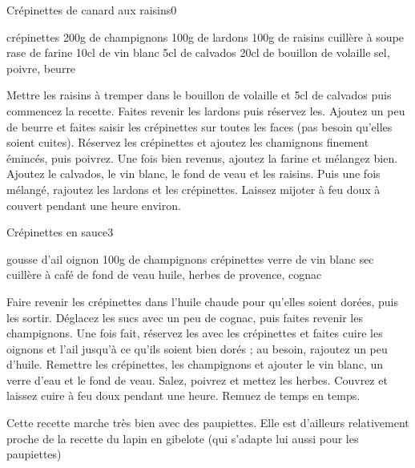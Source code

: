 \begin{recette}{Crépinettes de canard aux raisins}{0}{}{}
\begin{ingredients}
 crépinettes
\ingredient 200g de champignons
\ingredient 100g de lardons
\ingredient 100g de raisins
 cuillère à soupe rase de farine
\ingredient 10cl de vin blanc
\ingredient 5cl de calvados
\ingredient 20cl de bouillon de volaille
\ingredient sel, poivre, beurre
\end{ingredients}

\begin{preparation}
\etape Mettre les raisins à tremper dans le bouillon de volaille et 5cl de calvados puis commencez la recette.
\etape Faites revenir les lardons puis réservez les.
\etape Ajoutez un peu de beurre et faites saisir les crépinettes sur toutes les faces (pas besoin qu'elles soient cuites).
\etape Réservez les crépinettes et ajoutez les chamignons finement émincés, puis poivrez.
\etape Une fois bien revenus, ajoutez la farine et mélangez bien. Ajoutez le calvados, le vin blanc, le fond de veau et les raisins. Puis une fois mélangé, rajoutez les lardons et les crépinettes.
\etape Laissez mijoter à feu doux à couvert pendant une heure environ.
\end{preparation}
\end{recette}

\begin{recette}{Crépinettes en sauce}{3}{}{}

\begin{ingredients}
 gousse d'ail
 oignon
\ingredient 100g de champignons
 crépinettes
 verre de vin blanc sec
 cuillère à café de fond de veau
\ingredient huile, herbes de provence, cognac
\end{ingredients}

\begin{preparation}
\etape Faire revenir les crépinettes dans l'huile chaude pour qu'elles soient dorées, puis les sortir.
\etape Déglacez les sucs avec un peu de cognac, puis faites revenir les champignons.
\etape Une fois fait, réservez les avec les crépinettes et faites cuire les oignons et l'ail jusqu'à ce qu'ils soient bien dorés ; au besoin, rajoutez un peu d'huile.
\etape Remettre les crépinettes, les champignons et ajouter le vin blanc, un verre d'eau et le fond de veau. Salez, poivrez et mettez les herbes.
\etape Couvrez et laissez cuire à feu doux pendant une heure. Remuez de temps en temps.
\end{preparation}

\begin{remarque}
Cette recette marche très bien avec des paupiettes. Elle est d'ailleurs relativement proche de la recette du lapin en gibelote (qui s'adapte lui aussi pour les paupiettes)
\end{remarque}

\end{recette}

